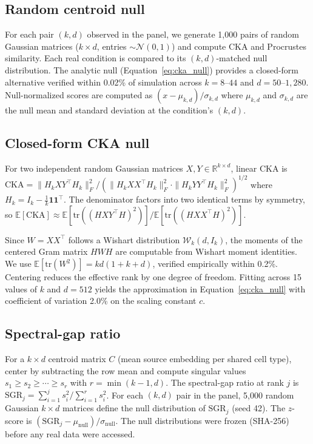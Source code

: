 \documentclass[11pt]{article}
\newcommand{\R}{\mathbb{R}}
\begin{document}
\subsection{Random centroid null}

For each pair $(k, d)$ observed in the panel, we generate 1,000 pairs
of random Gaussian matrices ($k \times d$, entries $\sim
\mathcal{N}(0,1)$) and compute CKA and Procrustes similarity. Each real
condition is compared to its $(k, d)$-matched null distribution. The
analytic null (Equation~\ref{eq:cka_null}) provides a closed-form
alternative verified within 0.02\% of simulation across $k = 8$--$44$
and $d = 50$--$1{,}280$. Null-normalized scores are computed as
$(x - \mu_{k,d}) / \sigma_{k,d}$ where $\mu_{k,d}$ and $\sigma_{k,d}$
are the null mean and standard deviation at the condition's $(k, d)$.

\subsection{Closed-form CKA null}
\label{sec:closedform}

For two independent random Gaussian matrices $X, Y \in \R^{k \times d}$,
linear CKA is $\mathrm{CKA} = \|H_k X Y^\top H_k\|_F^2 / (\|H_k X
X^\top H_k\|_F^2 \cdot \|H_k Y Y^\top H_k\|_F^2)^{1/2}$ where
$H_k = I_k - \frac{1}{k}\mathbf{1}\mathbf{1}^\top$. The denominator
factors into two identical terms by symmetry, so
$\mathbb{E}[\mathrm{CKA}] \approx \mathbb{E}[\mathrm{tr}((HXY^\top
H)^2)] / \mathbb{E}[\mathrm{tr}((HXX^\top H)^2)]$.

Since $W = XX^\top$ follows a Wishart distribution
$\mathcal{W}_k(d, I_k)$, the moments of the centered Gram matrix $HWH$
are computable from Wishart moment identities. We use
$\mathbb{E}[\mathrm{tr}(W^2)] = kd(1 + k + d)$, verified empirically
within 0.2\%. Centering reduces the effective rank by one degree of
freedom. Fitting across 15 values of $k$ and $d = 512$ yields the
approximation in Equation~\ref{eq:cka_null} with coefficient of
variation 2.0\% on the scaling constant $c$.

\subsection{Spectral-gap ratio}
\label{sec:sgrmethod}

For a $k \times d$ centroid matrix $C$ (mean source embedding per
shared cell type), center by subtracting the row mean and compute
singular values $s_1 \geq s_2 \geq \cdots \geq s_r$ with $r =
\min(k{-}1, d)$. The spectral-gap ratio at rank $j$ is $\mathrm{SGR}_j
= \sum_{i=1}^j s_i^2 / \sum_{i=1}^r s_i^2$. For each $(k, d)$ pair in
the panel, 5,000 random Gaussian $k \times d$ matrices define the null
distribution of $\mathrm{SGR}_j$ (seed 42). The $z$-score is
$({\mathrm{SGR}_j - \mu_{\mathrm{null}}}) / {\sigma_{\mathrm{null}}}$.
The null distributions were frozen (SHA-256) before any real data were
accessed.
\end{document}

